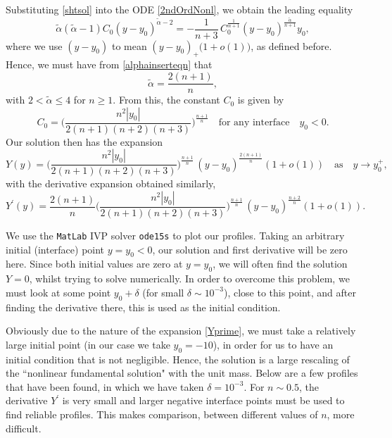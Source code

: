 \documentclass[12pt]{amsart}
\begin{document}
Substituting \eqref{shtsol} into the ODE \eqref{2ndOrdNonl}, we
obtain the leading equality
\begin{equation}
\label{alphainserteqn}
\tilde{\alpha}(\tilde{\alpha}-1)C_0(y-y_0)^{\tilde{\alpha}-2}=
\mbox{$-\frac{1}{n+3}\,C_0^{\frac{1}{n+1}}(y-y_0)^{\frac{\tilde{\alpha}}{n+1}}y_0$},
\end{equation}
where we use $(y-y_0)$ to mean $(y-y_0)_+\big(1+o(1)\big)$, as
defined before.  Hence, we must have from \eqref{alphainserteqn}
that
\begin{equation*}
\tilde{\alpha} = \mbox{$\frac{2(n+1)}{n}$},
\end{equation*}
with $2<\tilde{\alpha}\leq 4$    for $n\geq 1$.  From this, the
constant $C_0$ is given by
\begin{equation*}
C_0=\mbox{$\big(\frac{n^2|y_0|}{2(n+1)(n+2)(n+3)}
\big)^{\frac{n+1}{n}}$} \quad \text{for any interface} \quad
y_0<0.
\end{equation*}
Our solution then has the expansion
\begin{equation}
 \label{Yfbp}
Y(y)=\mbox{$\big(\frac{n^2|y_0|}{2(n+1)(n+2)(n+3)}
\big)^{\frac{n+1}{n}}\,(y-y_0)^{\frac{2(n+1)}{n}}$}(1+o(1)) {\quad \mbox{as} \quad} y
\to y_0^+,
\end{equation}
with the derivative expansion obtained similarly,
\begin{equation}
\label{Yprime}
Y^{\prime}(y)=\mbox{$\frac{2(n+1)}{n}\big(\frac{n^2|y_0|}{2(n+1)(n+2)(n+3)}
\big)^{\frac{n+1}{n}}\,(y-y_0)^{\frac{n+2}{n}}$}(1+o(1)).
\end{equation}

We use the {\tt MatLab} IVP solver {\tt ode15s} to plot our
profiles.
 Taking an arbitrary initial (interface) point $y=y_0<0$, our solution and
first derivative will be zero here.  Since both initial values are
zero at $y=y_0$, we will often find the solution $Y=0$, whilst
trying to solve numerically.  In order to overcome this problem,
we must look at some point $y_0+\delta$ (for small $\delta\sim
10^{-3}$), close to this point, and after finding the derivative
there, this is used as the initial condition.

Obviously due to the nature of the expansion  \eqref{Yprime}, we
must take a relatively large initial point (in our case we take
$y_0=-10$), in order for us to have an initial condition that is
not negligible. Hence, the solution is a large rescaling of the
``nonlinear fundamental solution" with the unit mass.
 Below are a few profiles that have been found, in which we have
taken $\delta=10^{-3}$.  For $n\sim 0.5$,
 the derivative
$Y^\prime$ is very small and larger negative interface
 points must
be used to find reliable profiles.  This makes comparison, between
different values of $n$, more difficult.
\end{document}
